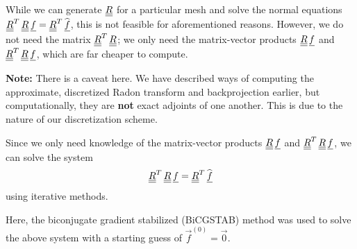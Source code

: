 \par 
While we can generate ${\underline{\underline{R}}}$ for a particular mesh and solve the normal equations ${\underline{\underline{R}}}^{T} \, {\underline{\underline{R}}} \, {\underline{f}} = {\underline{\underline{R}}}^{T} \, \widehat{{\underline{f}}}$, this is not feasible for aforementioned reasons.
However, we do not need the matrix ${\underline{\underline{R}}}^{T} \, {\underline{\underline{R}}}$; we only need the matrix-vector products ${\underline{\underline{R}}} \, {\underline{f}}$ and ${\underline{\underline{R}}}^{T} \, {\underline{\underline{R}}} \, {\underline{f}}$, which are far cheaper to compute.
\par 
\textbf{Note:} There is a caveat here. 
We have described ways of computing the approximate, discretized Radon transform and backprojection earlier, but computationally, they are \textbf{not} exact adjoints of one another.
This is due to the nature of our discretization scheme.
\par 
Since we only need knowledge of the matrix-vector products ${\underline{\underline{R}}} \, {\underline{f}}$ and ${\underline{\underline{R}}}^{T} \, {\underline{\underline{R}}} \, {\underline{f}}$, we can solve the system
\begin{align}
    {\underline{\underline{R}}}^{T} \, {\underline{\underline{R}}} \, {\underline{f}} = {\underline{\underline{R}}}^{T} \, \widehat{{\underline{f}}}
\end{align}
using iterative methods.
\par 
Here, the biconjugate gradient stabilized (BiCGSTAB) method was used to solve the above system with a starting guess of $\vec{f}^{(0)} = \vec{0}$.


